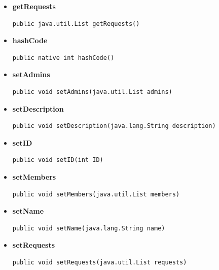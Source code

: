 \documentclass[11pt,a4paper]{article}
\begin{document}
{{{{{\begin{itemize}
{}%
\item{ 
\hypertarget{edu.kit.pse17.go_app.PersistenceLayer.GroupEntity.getRequests()}{{\bf  getRequests}\\}
\begin{lstlisting}[frame=none]
public java.util.List getRequests()\end{lstlisting} %
}%
\item{ 
\hypertarget{edu.kit.pse17.go_app.PersistenceLayer.GroupEntity.hashCode()}{{\bf  hashCode}\\}
\begin{lstlisting}[frame=none]
public native int hashCode()\end{lstlisting} %
}%
\item{ 
\hypertarget{edu.kit.pse17.go_app.PersistenceLayer.GroupEntity.setAdmins(java.util.List)}{{\bf  setAdmins}\\}
\begin{lstlisting}[frame=none]
public void setAdmins(java.util.List admins)\end{lstlisting} %
}%
\item{ 
\hypertarget{edu.kit.pse17.go_app.PersistenceLayer.GroupEntity.setDescription(java.lang.String)}{{\bf  setDescription}\\}
\begin{lstlisting}[frame=none]
public void setDescription(java.lang.String description)\end{lstlisting} %
}%
\item{ 
\hypertarget{edu.kit.pse17.go_app.PersistenceLayer.GroupEntity.setID(int)}{{\bf  setID}\\}
\begin{lstlisting}[frame=none]
public void setID(int ID)\end{lstlisting} %
}%
\item{ 
\hypertarget{edu.kit.pse17.go_app.PersistenceLayer.GroupEntity.setMembers(java.util.List)}{{\bf  setMembers}\\}
\begin{lstlisting}[frame=none]
public void setMembers(java.util.List members)\end{lstlisting} %
}%
\item{ 
\hypertarget{edu.kit.pse17.go_app.PersistenceLayer.GroupEntity.setName(java.lang.String)}{{\bf  setName}\\}
\begin{lstlisting}[frame=none]
public void setName(java.lang.String name)\end{lstlisting} %
}%
\item{ 
\hypertarget{edu.kit.pse17.go_app.PersistenceLayer.GroupEntity.setRequests(java.util.List)}{{\bf  setRequests}\\}
\begin{lstlisting}[frame=none]
public void setRequests(java.util.List requests)\end{lstlisting} %
}%
\end{itemize}
}
}
}}}
\end{document}
